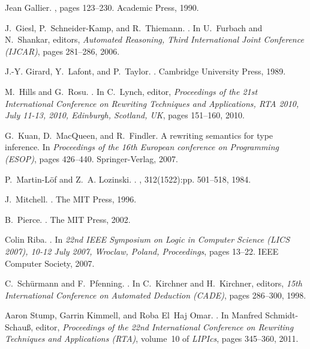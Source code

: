 \documentclass{LMCS}
\begin{document}
\begin{thebibliography}{10}
Jean Gallier.
, pages 123--230.
\newblock Academic Press, 1990.

J.~Giesl, P.~Schneider-Kamp, and R.~Thiemann.
.
\newblock In U.~Furbach and N.~Shankar, editors, {\em Automated Reasoning,
  Third International Joint Conference (IJCAR)}, pages 281--286, 2006.

J.-Y. Girard, Y.~Lafont, and P.~Taylor.
.
\newblock Cambridge University Press, 1989.

M.~Hills and G.~Rosu.
.
\newblock In C.~Lynch, editor, {\em Proceedings of the 21st International
  Conference on Rewriting Techniques and Applications, RTA 2010, July 11-13,
  2010, Edinburgh, Scotland, UK}, pages 151--160, 2010.

G.~Kuan, D.~MacQueen, and R.~Findler.
\newblock A rewriting semantics for type inference.
\newblock In {\em Proceedings of the 16th European conference on Programming
  (ESOP)}, pages 426--440. Springer-Verlag, 2007.

P.~Martin-L{\"o}f and Z.~A. Lozinski.
.
, 312(1522):pp. 501--518, 1984.

J.~Mitchell.
.
\newblock The MIT Press, 1996.

B.~Pierce.
.
\newblock The MIT Press, 2002.

Colin Riba.
.
\newblock In {\em 22nd IEEE Symposium on Logic in Computer Science (LICS 2007),
  10-12 July 2007, Wroclaw, Poland, Proceedings}, pages 13--22. IEEE Computer
  Society, 2007.

C.~Sch{\"u}rmann and F.~Pfenning.
.
\newblock In C.~Kirchner and H.~Kirchner, editors, {\em 15th International
  Conference on Automated Deduction (CADE)}, pages 286--300, 1998.

Aaron Stump, Garrin Kimmell, and Roba El~Haj Omar.
.
\newblock In Manfred Schmidt-Schau{\ss}, editor, {\em Proceedings of the 22nd
  International Conference on Rewriting Techniques and Applications (RTA)},
  volume~10 of {\em LIPIcs}, pages 345--360, 2011.


\end{thebibliography}
\end{document}
